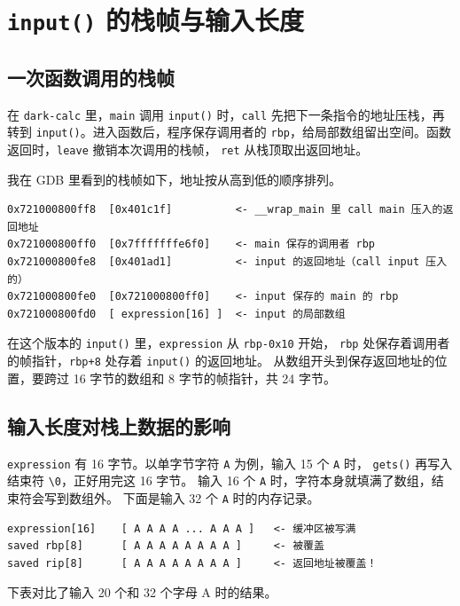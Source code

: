 \documentclass[UTF8,a4paper,12pt,fontset=windows]{ctexart}
\newcommand{\code}[1]{\texttt{#1}}
\begin{document}
\section{\texorpdfstring{\code{input()}}{input()} 的栈帧与输入长度}

\subsection{一次函数调用的栈帧}

在 \code{dark-calc} 里，\code{main} 调用 \code{input()} 时，\code{call}
先把下一条指令的地址压栈，再转到 \code{input()}。进入函数后，程序保存调用者的
\code{rbp}，给局部数组留出空间。函数返回时，\code{leave} 撤销本次调用的栈帧，
\code{ret} 从栈顶取出返回地址。

我在 GDB 里看到的栈帧如下，地址按从高到低的顺序排列。

\begin{lstlisting}
0x721000800ff8  [0x401c1f]          <- __wrap_main 里 call main 压入的返回地址
0x721000800ff0  [0x7fffffffe6f0]    <- main 保存的调用者 rbp
0x721000800fe8  [0x401ad1]          <- input 的返回地址（call input 压入的）
0x721000800fe0  [0x721000800ff0]    <- input 保存的 main 的 rbp
0x721000800fd0  [ expression[16] ]  <- input 的局部数组
\end{lstlisting}

在这个版本的 \code{input()} 里，\code{expression} 从 \code{rbp-0x10} 开始，
\code{rbp} 处保存着调用者的帧指针，\code{rbp+8} 处存着 \code{input()} 的返回地址。
从数组开头到保存返回地址的位置，要跨过 16 字节的数组和 8 字节的帧指针，共 24 字节。

\subsection{输入长度对栈上数据的影响}

\code{expression} 有 16 字节。以单字节字符 \code{A} 为例，输入 15 个 \code{A} 时，
\code{gets()} 再写入结束符 \code{\textbackslash 0}，正好用完这 16 字节。
输入 16 个 \code{A} 时，字符本身就填满了数组，结束符会写到数组外。
下面是输入 32 个 \code{A} 时的内存记录。

\begin{lstlisting}
expression[16]    [ A A A A ... A A A ]   <- 缓冲区被写满
saved rbp[8]      [ A A A A A A A A ]     <- 被覆盖
saved rip[8]      [ A A A A A A A A ]     <- 返回地址被覆盖！
\end{lstlisting}

下表对比了输入 20 个和 32 个字母 A 时的结果。
\end{document}
